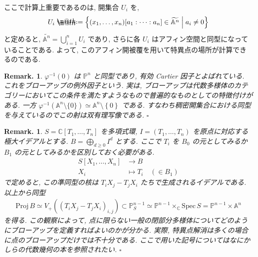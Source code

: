 \documentclass[openany, a4paper, oneside]{jsbook}
\makeatletter
\newcommand*{\defeq}{\mathrel{\rlap{%
\raisebox{0.3ex}{$\m@th\cdot$}}%
\raisebox{-0.3ex}{$\m@th\cdot$}}%
=}
\theoremstyle{break}
\theoremstyle{breakdefn}
\newtheorem{rem}[thm]{Remark.}
\newcommand{\cbk}[1]{\left\{#1\right\}}
\newcommand{\relmiddle}[1]{\mathrel{}\middle#1\mathrel{}}
\newcommand{\set}[2]{\left\{#1 \relmiddle| #2\right\}}
\newcommand{\fin}{\hfill $\square$ \par}
\newcommand{\proj}{\mathrm{Proj}\,}
\newcommand{\spec}{\mathrm{Spec}\,}
\makeatother
\begin{document}
ここで計算上重要であるのは, 開集合 $U_i$ を,
\begin{align}
 U_i
 \defeq
 \set{(x_1,\dots,x_n) [a_1:\dots:a_n] \in \widetilde{\mathbb{A}^n}}{a_i \neq 0}
\end{align}
と定めると, $\widetilde{\mathbb{A}^n} = \bigcup_{i=1}^n U_i$ であり,
さらに各 $U_i$ はアフィン空間と同型になっていることである.
よって, このアフィン開被覆を用いて特異点の場所が計算できるのである.
\begin{rem}
$\varphi^{-1}(0)$ は $\mathbb{P}^n$ と同型であり,
有効 Cartier 因子とよばれている.
これをブローアップの例外因子という.
実は, ブローアップは代数多様体のカテゴリーにおいてこの条件を満たすようなもので普遍的なものとしての特徴付けがある.
一方 $\varphi^{-1}(\mathbb{A}^n \setminus \{0\}) \simeq \mathbb{A}^n \setminus \cbk{0}$ である.
すなわち稠密開集合における同型を与えているのでこの射は双有理写像である. \fin
\end{rem}
\begin{rem}
$S=\mathbb{C}[T_1, \dots, T_n]$ を多項式環, $I=(T_1, \dots, T_n)$ を原点に対応する極大イデアルとする.
$B=\bigoplus_{d \geq 0} I^d$ とする.
ここで $T_i$ を $B_0$ の元としてみるか $B_1$ の元としてみるかを区別しておく必要がある.
\begin{align}
 S[X_1,\dots,X_n]
 &\longrightarrow
 B \\
 X_i
 &\longmapsto
 T_i \quad (\in B_1)
\end{align}
で定めると, この準同型の核は $T_iX_j - T_jX_i$ たちで生成されるイデアルである.
以上から同型
\begin{align}
 \proj B
 \simeq
 V_+ ((T_iX_j-T_jX_i)_{i,j})
 \subset
 \mathbb{P}_S^{n-1}
 \simeq
 \mathbb{P}^{n-1} \times_\mathbb{C} \spec S
 =
 \mathbb{P}^{n-1} \times \mathbb{A}^n
\end{align}
を得る.
この観察によって, 点に限らない一般の閉部分多様体についてどのようにブローアップを定義すればよいのかが分かる.
実際, 特異点解消は多くの場合に点のブローアップだけでは不十分である.
ここで用いた記号についてはなにかしらの代数幾何の本を参照されたい. \fin
\end{rem}
\end{document}
